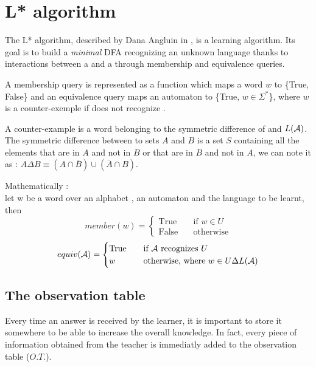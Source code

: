 \section{L* algorithm}

The L* algorithm, described by Dana Angluin in \cite{angluinL}, is a learning algorithm. Its goal is to build a \textit{minimal} DFA recognizing an unknown language \langU{} thanks to interactions between a \learner{} and a \teacher{} through membership and equivalence queries.

\begin{definition}
  A membership query is represented as a function which maps a word $w$ to \{True, False\} and an equivalence query maps an automaton \automaton{} to \{True, $w \in \Sigma^*$\}, where $w$ is a counter-exemple if \automaton{} does not recognize \langU{}.
\end{definition}

\begin{definition}
  A counter-example is a word belonging to the symmetric difference of \langU{} and $L(\mathcal{A}{})$. The symmetric difference between to sets $A$ and $B$ is a set $S$ containing all the elements that are in $A$ and not in $B$ or that are in $B$ and not in $A$, we can note it as : $A \Delta B \equiv (A \cap \bar{B}) \cup (\bar{A} \cap B)$.
\end{definition}

Mathematically :\\
let w be a word over an alphabet \alphabet{}, \automaton{} an automaton and \langU{} the language to be learnt, then
\[ member(w) =
  \begin{cases}
    \text{True}  & \quad \text{if } w \in U \\
    \text{False} & \quad \text{otherwise}
  \end{cases}
\]
\[ equiv(\mathcal{A}{}) =
  \begin{cases}
    \text{True} & \quad \text{if } \mathcal{A}{} \text{ recognizes } U           \\
    w           & \quad \text{otherwise, where } w \in U \Delta L(\mathcal{A}{})
  \end{cases}
\]


\subsection{The observation table}
Every time an answer is received by the learner, it is important to store it somewhere to be able to increase the overall knowledge. In fact, every piece of information obtained from the teacher is immediatly added to the observation table ($O.T.$).

